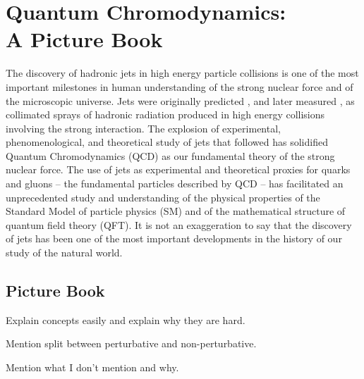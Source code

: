 \chapter[Quantum Chromodynamics: A Picture Book]{Quantum Chromodynamics:\\A Picture Book}

The discovery of hadronic jets in high energy particle collisions is one of the most important milestones in human understanding of the strong nuclear force and of the microscopic universe.
%
Jets were originally predicted \cite{}, and later measured \cite{}, as collimated sprays of hadronic radiation produced in high energy collisions involving the strong interaction.
%
The explosion of experimental, phenomenological, and theoretical study of jets that followed has solidified Quantum Chromodynamics (QCD) as our fundamental theory of the strong nuclear force.
%
The use of jets as experimental and theoretical proxies for quarks and gluons -- the fundamental particles described by QCD -- has facilitated an unprecedented study and understanding of the physical properties of the Standard Model of particle physics (SM) and of the mathematical structure of quantum field theory (QFT).
%
It is not an exaggeration to say that the discovery of jets has been one of the most important developments in the history of our study of the natural world.


\section{Picture Book}

Explain concepts easily and explain why they are hard.

Mention split between perturbative and non-perturbative.

Mention what I don't mention and why.


\begin{sourcefigure}[ht]
    \centering

    \caption{
    }

    \label{fig:picturebook_particles}
\end{sourcefigure}

